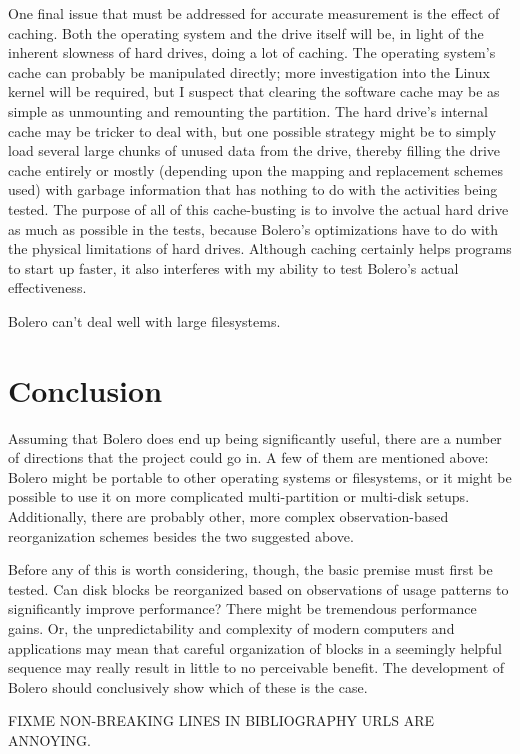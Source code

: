 \documentclass[10pt,twocolumn,letterpaper]{article}
\begin{document}
One final issue that must be addressed for accurate measurement is the effect of caching. Both
the operating system and the drive itself will be, in light of the inherent slowness of hard drives,
doing a lot of caching. The operating system's cache can probably be manipulated directly; more
investigation into the Linux kernel will be required, but I suspect that clearing the software
cache may be as simple as unmounting and remounting the partition. The hard drive's internal cache
may be tricker to deal with, but one possible strategy might be to simply load several large chunks of
unused data from the drive, thereby filling the drive cache entirely or mostly (depending upon the mapping
and replacement schemes used) with garbage information that has nothing to do with the activities being tested.
The purpose of all of this cache-busting is to involve the actual hard drive as much as possible
in the tests, because Bolero's optimizations have to do with the physical limitations of hard drives. Although caching certainly helps programs to start up faster, it also interferes with my ability to test Bolero's actual effectiveness.

Bolero can't deal well with large filesystems.

\section{Conclusion}

Assuming that Bolero does end up being significantly useful, there are a number of directions that
the project could go in. A few of them are mentioned above: Bolero might be portable to other
operating systems or filesystems, or it might be possible to use it on more complicated multi-partition
or multi-disk setups. Additionally, there are probably other, more complex observation-based reorganization schemes
besides the two suggested above.

Before any of this is worth considering, though, the basic premise must first be tested. Can disk
blocks be reorganized based on observations of usage patterns to significantly improve performance?
There might be tremendous performance gains. Or, the unpredictability and complexity of modern
computers and applications may mean that careful organization of blocks in a seemingly helpful
sequence may really result in little to no perceivable benefit. The development of Bolero should conclusively
show which of these is the case.

FIXME NON-BREAKING LINES IN BIBLIOGRAPHY URLS ARE ANNOYING.

{}

\end{document}
